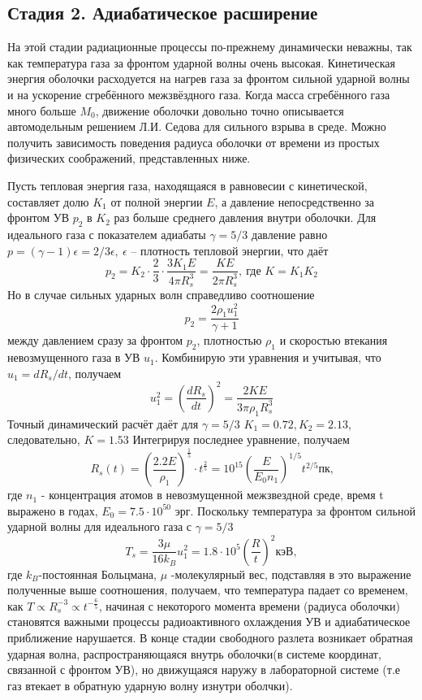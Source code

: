\documentclass[a4paper,12pt]{extarticle}
\begin{document}
\subsection{Стадия 2. Адиабатическое расширение} \label{sec: adiabatic_exp}
На этой стадии радиационные процессы по-прежнему динамически неважны, так как температура газа за фронтом ударной волны очень высокая. Кинетическая энергия оболочки расходуется на нагрев газа за фронтом сильной ударной волны и на ускорение сгребённого межзвёздного газа. Когда масса сгребённого газа много больше $M_0$, движение оболочки довольно точно описывается автомодельным решением Л.И. Седова для сильного взрыва в среде. 
Можно получить зависимость поведения радиуса оболочки от времени из простых физических соображений, представленных ниже.

Пусть тепловая энергия газа, находящаяся в равновесии с кинетической, составляет долю $K_1$ от полной энергии $E$, а давление непосредственно за фронтом УВ $p_2$ в $K_2$ раз больше среднего давления внутри оболочки. Для идеального газа с показателем адиабаты $\gamma=5/3$  давление равно $p=(\gamma-1)\epsilon=2/3\epsilon,\  \epsilon$ --  плотность тепловой энергии, что даёт 
$$p_2=K_2\cdot \frac{2}{3}\cdot \frac{3K_1E}{4\pi R_s^3}=\frac{KE}{2\pi R_s^3},\ \text{где } K=K_1K_2$$
Но в случае сильных ударных волн справедливо соотношение
$$p_2=\frac{2\rho_1u_1^2}{\gamma+1}$$
между давлением сразу за фронтом $p_2$, плотностью $\rho_1$ и скоростью втекания невозмущенного газа в УВ $u_1$. Комбинирую эти уравнения и учитывая, что $u_1=dR_s/dt$, получаем $$u_1^2=\left(\frac{dR_s}{dt}\right)^2=\frac{2KE}{3\pi \rho_1 R_s^3}$$
Точный динамический расчёт даёт для $\gamma=5/3$ $K_1=0.72,K_2=2.13$, следовательно, $K=1.53$ 
Интегрируя последнее уравнение, получаем 
$$R_s(t)=\left(\frac{2.2E}{\rho_1}\right)^{\frac{1}{5}}\cdot t^{\frac{2}{5}}=10^{15} \left(\frac{E}{E_0 n_1}\right)^{1/5} t^{2/5} \text{пк,}$$
где $n_1$ - концентрация атомов в невозмущенной межзвездной среде, время t выражено в годах, $E_0 = 7.5\cdot10^{50}$ эрг.
Поскольку температура за фронтом сильной ударной волны для идеального газа с $\gamma=5/3$
$$T_s = \frac{3\mu}{16k_B}u_1^2=1.8\cdot 10^5 \left(\frac{R}{t} \right)^2\text{кэВ},$$
где $k_B$-постоянная Больцмана, $\mu$ -молекулярный вес,
подставляя в это выражение полученные выше соотношения, получаем, что температура падает со временем, как 
$T \propto R_s^{-3} \propto t^{-\frac{6}{5}}$, начиная с некоторого момента времени (радиуса оболочки) становятся важными процессы радиоактивного охлаждения УВ и адиабатическое приближение нарушается. 
В конце стадии свободного разлета возникает обратная ударная волна, распространяющаяся внутрь оболочки(в системе координат, связанной с фронтом УВ), но движущаяся наружу в лабораторной системе (т.е газ втекает в обратную ударную волну изнутри оболчки). 
\end{document}
